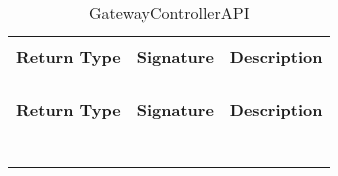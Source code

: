 \begin{longtable}{p{}p{}p{}}
    \caption{GatewayControllerAPI}
    \vspace{0.5em}\\
    \hline
    \vspace{0.5em}\\
    \textbf{Return Type} & \textbf{Signature} & \textbf{Description} \\
    \vspace{0.5em}\\
    \hline
    \vspace{0.5em}\\
    \endfirsthead
    \vspace{0.5em}\\
    \hline
    \vspace{0.5em}\\
    \textbf{Return Type} & \textbf{Signature} & \textbf{Description} \\
    \vspace{0.5em}\\
    \hline
    \vspace{0.5em}\\
    \endhead
    
    \vspace{0.5em}\\
    \hline
    \vspace{0.5em}\\
    \endfoot
    
    \vspace{0.5em}\\
    \hline
    \vspace{0.5em}\\
    \endlastfoot
    

\end{longtable}
